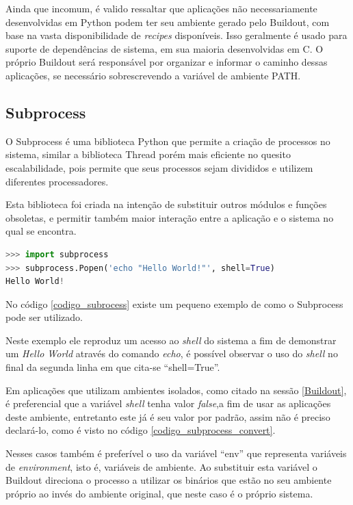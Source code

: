 Ainda que incomum, é valido ressaltar que aplicações não necessariamente desenvolvidas em Python podem ter seu ambiente gerado pelo Buildout, com base na vasta disponibilidade de \textit{recipes} disponíveis. Isso geralmente é usado para suporte de dependências de sistema, em sua maioria desenvolvidas em C. O próprio Buildout será responsável por organizar e informar o caminho dessas aplicações, se necessário sobrescrevendo a variável de ambiente PATH.

\subsection{Subprocess}

O Subprocess é uma biblioteca Python que permite a criação de processos no sistema, similar a biblioteca Thread porém mais eficiente no quesito escalabilidade, pois permite que seus processos sejam divididos e utilizem diferentes processadores. 

Esta biblioteca foi criada na intenção de substituir outros módulos e funções obsoletas, e permitir também maior interação entre a aplicação e o sistema no qual se encontra.

{\singlespace
\begin{lstlisting}[caption=Exemplo de uso do Subprocess,language=python,label={codigo_subrocess}]
>>> import subprocess
>>> subprocess.Popen('echo "Hello World!"', shell=True)
Hello World!
\end{lstlisting}
}

No código \ref{codigo_subrocess} existe um pequeno exemplo de como o Subprocess pode ser utilizado.

Neste exemplo ele reproduz um acesso ao \textit{shell} do sistema a fim de demonstrar um \textit{Hello World} através do comando \textit{echo}, é possível observar o uso do \textit{shell} no final da segunda linha em que cita-se ``shell=True''.

Em aplicações que utilizam ambientes isolados, como citado na sessão \ref{Buildout}, é preferencial que a variável \textit{shell} tenha valor \textit{false},a fim de usar as aplicações deste ambiente, entretanto este já é seu valor por padrão, assim não é preciso declará-lo, como é visto no código \ref{codigo_subprocess_convert}.

Nesses casos também é preferível o uso da variável ``env'' que representa variáveis de \textit{environment}, isto é, variáveis de ambiente. Ao substituir esta variável o Buildout direciona o processo a utilizar os binários que estão no seu ambiente próprio ao invés do ambiente original, que neste caso é o próprio sistema.

